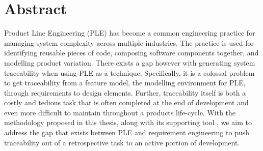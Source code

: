 \chapter*{Abstract}

Product Line Engineering (PLE) has become a common engineering practice for managing system complexity across multiple industries. The practice is used for identifying reusable pieces of code, composing software components together, and modelling product variation. There exists a gap however with generating system traceability when using PLE as a technique. Specifically, it is a colossal problem to get traceability from a feature model, the modelling environment for PLE, through requirements to design elements. Further, traceability itself is both a costly and tedious task that is often completed at the end of development and even more difficult to maintain throughout a products life-cycle. With the methodology proposed in this thesis, along with its supporting tool \tool, we aim to address the gap that exists between PLE and requirement engineering to push traceability out of a retrospective task to an active portion of development.